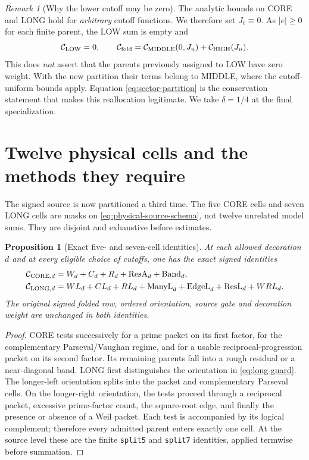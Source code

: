 \documentclass[11pt]{article}
\newtheorem{proposition}[theorem]{Proposition}
\theoremstyle{definition}
\theoremstyle{remark}
\newtheorem{remark}[theorem]{Remark}
\newcommand{\1}{\mathbf 1}
\begin{document}
\begin{remark}[Why the lower cutoff may be zero]\label{rem:zero-low}
The analytic bounds on CORE and LONG hold for \emph{arbitrary}
cutoff functions. We therefore set $J_\ell\equiv0$. As
$|e|\ge0$ for each finite parent, the LOW sum is empty and
\begin{equation}\label{eq:low-zero}
 \mathcal C_{\rm LOW}=0,\qquad
 \mathcal C_{\rm fold}
 =\mathcal C_{\rm MIDDLE}(0,J_u)+\mathcal C_{\rm HIGH}(J_u).
\end{equation}
This does \emph{not} assert that the parents previously assigned to
LOW have zero weight. With the new partition their terms belong
to MIDDLE, where the cutoff-uniform bounds apply. Equation
\eqref{eq:sector-partition} is the conservation statement that
makes this reallocation legitimate. We take $\delta=1/4$ at the
final specialization.
\end{remark}

\section{Twelve physical cells and the methods they require}
\label{sec:cells}

The signed source is now partitioned a third time. The five CORE
cells and seven LONG cells are masks on
\eqref{eq:physical-source-schema}, not twelve unrelated
model sums. They are disjoint and exhaustive before estimates.

\begin{proposition}[Exact five- and seven-cell identities]
\label{prop:physical-decomposition}
At each allowed decoration $d$ and at every eligible choice of
cutoffs, one has the exact signed identities
\begin{align}
 \mathcal C_{{\rm CORE},d}
 &=W_d+C_d+R_d+\mathrm{ResA}_d+\mathrm{Band}_d,
 \label{eq:core-five}\\
 \mathcal C_{{\rm LONG},d}
 &=WL_d+CL_d+RL_d+\mathrm{ManyL}_d
    +\mathrm{EdgeL}_d+\mathrm{ResL}_d+WRL_d.
 \label{eq:long-seven}
\end{align}
The original signed folded row, ordered orientation, source gate
and decoration weight are unchanged in both identities.
\end{proposition}

\begin{proof}
CORE tests successively for a prime packet on its first factor,
for the complementary Parseval/Vaughan regime, and for a usable
reciprocal-progression packet on its second factor. Its remaining
parents fall into a rough residual or a near-diagonal band. LONG
first distinguishes the orientation in \eqref{eq:long-guard}. The
longer-left orientation splits into the packet and complementary
Parseval cells. On the longer-right orientation, the tests proceed
through a reciprocal packet, excessive prime-factor count, the
square-root edge, and finally the presence or absence of a Weil
packet. Each test is accompanied by its logical complement;
therefore every admitted parent enters exactly one cell. At the
source level these are the finite \texttt{split5} and
\texttt{split7} identities, applied termwise before summation.
\end{proof}
\end{document}
